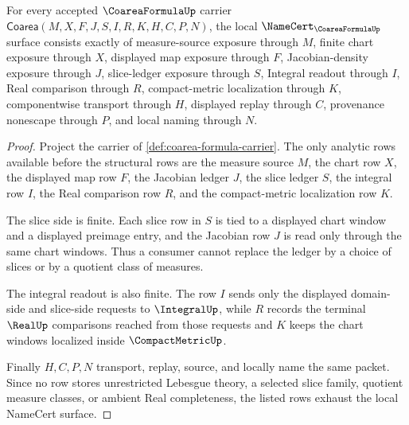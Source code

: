\begin{theorem}
\label{thm:coarea-formula-namecert-obligations}
For every accepted $\CoareaFormulaUp$ carrier $\mathsf{Coarea}(M,X,F,J,S,I,R,K,H,C,P,N)$, the local $\NameCert_{\CoareaFormulaUp}$ surface consists exactly of measure-source exposure through $M$, finite chart exposure through $X$, displayed map exposure through $F$, Jacobian-density exposure through $J$, slice-ledger exposure through $S$, Integral readout through $I$, Real comparison through $R$, compact-metric localization through $K$, componentwise transport through $H$, displayed replay through $C$, provenance nonescape through $P$, and local naming through $N$.
\end{theorem}
\begin{proof}
Project the carrier of \autoref{def:coarea-formula-carrier}. The only analytic rows available before the structural rows are the measure source $M$, the chart row $X$, the displayed map row $F$, the Jacobian ledger $J$, the slice ledger $S$, the integral row $I$, the Real comparison row $R$, and the compact-metric localization row $K$.

The slice side is finite. Each slice row in $S$ is tied to a displayed chart window and a displayed preimage entry, and the Jacobian row $J$ is read only through the same chart windows. Thus a consumer cannot replace the ledger by a choice of slices or by a quotient class of measures.

The integral readout is also finite. The row $I$ sends only the displayed domain-side and slice-side requests to $\IntegralUp$, while $R$ records the terminal $\RealUp$ comparisons reached from those requests and $K$ keeps the chart windows localized inside $\CompactMetricUp$.

Finally $H,C,P,N$ transport, replay, source, and locally name the same packet. Since no row stores unrestricted Lebesgue theory, a selected slice family, quotient measure classes, or ambient Real completeness, the listed rows exhaust the local NameCert surface.
\end{proof}

